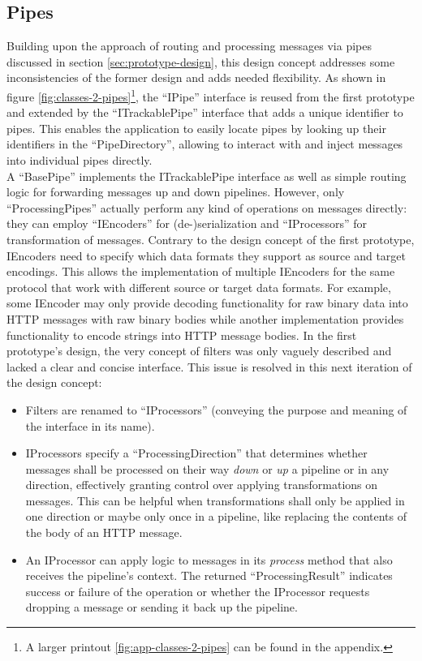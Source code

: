 \subsection{Pipes} Building upon the approach of routing and processing messages via pipes discussed in section \ref{sec:prototype-design}, this design concept addresses some inconsistencies of the former design and adds needed flexibility. As shown in figure \ref{fig:classes-2-pipes}\footnote{A larger printout \ref{fig:app-classes-2-pipes} can be found in the appendix.}, the \enquote{IPipe} interface is reused from the first prototype and extended by the \enquote{ITrackablePipe} interface that adds a unique identifier to pipes. This enables the application to easily locate pipes by looking up their identifiers in the \enquote{PipeDirectory}, allowing to interact with and inject messages into individual pipes directly.\\
A \enquote{BasePipe} implements the ITrackablePipe interface as well as simple routing logic for forwarding messages up and down pipelines. However, only \enquote{ProcessingPipes} actually perform any kind of operations on messages directly: they can employ \enquote{IEncoders} for (de-)serialization and \enquote{IProcessors} for transformation of messages. Contrary to the design concept of the first prototype, IEncoders need to specify which data formats they support as source and target encodings. This allows the implementation of multiple IEncoders for the same protocol that work with different source or target data formats. For example, some IEncoder may only provide decoding functionality for raw binary data into \ac{HTTP} messages with raw binary bodies while another implementation provides functionality to encode strings into \ac{HTTP} message bodies. In the first prototype's design, the very concept of filters was only vaguely described and lacked a clear and concise interface. This issue is resolved in this next iteration of the design concept:
\begin{itemize}
    \item Filters are renamed to \enquote{IProcessors} (conveying the purpose and meaning of the interface in its name).
    \item IProcessors specify a \enquote{ProcessingDirection} that determines whether messages shall be processed on their way \emph{down} or \emph{up} a pipeline or in any direction, effectively granting control over applying transformations on messages. This can be helpful when transformations shall only be applied in one direction or maybe only once in a pipeline, like replacing the contents of the body of an \ac{HTTP} message.
    \item An IProcessor can apply logic to messages in its \emph{process} method that also receives the pipeline's context. The returned \enquote{ProcessingResult} indicates success or failure of the operation or whether the IProcessor requests dropping a message or sending it back up the pipeline.
\end{itemize}
